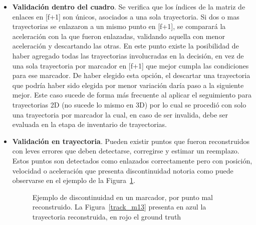 \begin{itemize}
\item \textbf{Validación dentro del cuadro}. Se verifica que los índices de la matriz de enlaces en [f+1] son únicos, asociados a una sola trayectoria. Si dos o mas trayectorias se enlazaron a un mismo punto en [f+1], se comparará la aceleración con la que fueron enlazadas, validando aquella con menor aceleración y descartando las otras. En este punto existe la posibilidad de haber agregado todas las trayectorias involucradas en la decisión, en vez de una sola trayectoria por marcador en [f+1] que mejor cumpla las condiciones para ese marcador. De haber elegido esta opción, el descartar una trayectoria que podría haber sido elegida por menor variación daría paso a la siguiente mejor. Este caso sucede de forma más frecuente al aplicar el seguimiento para trayectorias 2D (no sucede lo mismo en 3D) por lo cual se procedió con solo una trayectoria por marcador la cual, en caso de ser invalida, debe ser evaluada en la etapa de inventario de trayectorias.  
\item \textbf{Validación en trayectoria}. Pueden existir puntos que fueron reconstruidos con leves errores que deben detectarse, corregirse y estimar un reemplazo. Estos puntos son detectados como enlazados correctamente pero con posición, velocidad o aceleración que presenta discontinuidad notoria como puede observarse en el ejemplo de la Figura~\ref{discontinuidad_tracking}.

\begin{figure}[ht!]
 \centering
 \caption{Ejemplo de discontinuidad en un marcador, por punto mal reconstruido. La Figura~\ref{track_m13} presenta en azul la trayectoria reconstruida, en rojo el ground truth}
 \label{discontinuidad_tracking}
\end{figure}


\end{itemize}
